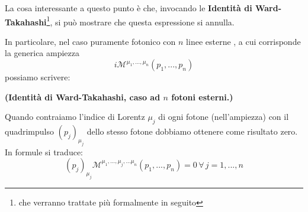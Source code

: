 \documentclass[../main.tex]{subfiles}
\begin{document}
\begin{enumerate}
                La cosa interessante a questo punto è che, invocando le \textbf{Identità di Ward-Takahashi}\footnote{che verranno trattate più formalmente in seguito}, si può mostrare che questa espressione si annulla.

                In particolare, nel caso puramente fotonico con $n$ linee esterne , a cui corrisponde la generica ampiezza
                \[
                i\mathscr{M}^{\mu_1,...,\mu_n}(p_1, ..., p_n)
                \]
                possiamo scrivere:
                \begin{theorem}
                    \textbf{(Identità di Ward-Takahashi, caso ad $n$ fotoni esterni.)}
                    
                    

                    Quando contraiamo l'indice di Lorentz $\mu_j$ di ogni fotone (nell'ampiezza) con il quadrimpulso $(p_j)_{\mu_j}$ dello stesso fotone dobbiamo ottenere come risultato zero.\\
                    In formule si traduce:
                    \[
                    (p_j)_{\mu_j}\mathscr{M}^{\mu_1,...,\mu_j,...\mu_n}(p_1, ..., p_n) = 0 \, \forall \, j=1,...,n
                    \]
                    \label{th:WTI_nphot}
                \end{theorem}
                

\end{enumerate}
\end{document}
